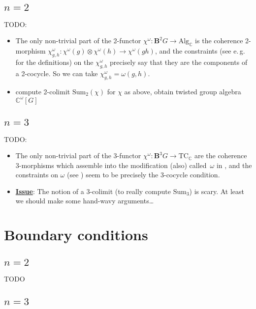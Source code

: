 \documentclass[12pt]{scrartcl}
\newcommand{\boldB}{\boldsymbol{B}}
\newcommand{\C}{\mathds{C}}
\theoremstyle{definition}
\numberwithin{equation}{section}
\numberwithin{definition}{section}
\numberwithin{figure}{section}
\begin{document}
\subsection{$n=2$}

TODO: 
\begin{itemize}
\item
The only non-trivial part of the 2-functor $\chi^\omega \colon \boldB^2 G \to \text{Alg}_\C$ is the coherence 2-morphism $\chi_{g,h}^\omega \colon \chi^\omega(g) \otimes  \chi^\omega(h) \to \chi^\omega(gh)$, and the constraints (see e.\,g.~\cite[Sect.\,1.1]{LeinsterBasic2} for the definitions) on the $\chi_{g,h}^\omega$ precisely say that they are the components of a 2-cocycle. 
So we can take $\chi_{g,h}^\omega = \omega(g,h)$. 
\item 
compute 2-colimit $\text{Sum}_2(\chi)$ for $\chi$ as above, obtain twisted group algebra $\C^\omega[G]$
\end{itemize}


\subsection{$n=3$}

TODO:
\begin{itemize}
\item
The only non-trivial part of the 3-functor $\chi^\omega \colon \boldB^3 G \to \text{TC}_\C$ are the coherence 3-morphisms which assemble into the modification (also) called~$\omega$ in \cite[Def.\,A.4.3]{GregorDiss}, and the constraints on $\omega$ (see \cite[Page~219]{GregorDiss}) seem to be precisely the 3-cocycle condition. 
\item
\underline{\textbf{Issue}}: The notion of a 3-colimit (to really compute $\text{Sum}_3$) is scary. 
At least we should make some hand-wavy arguments\dots
\end{itemize}


\section{Boundary conditions}

\subsection{$n=2$}

TODO

\subsection{$n=3$}
\end{document}
